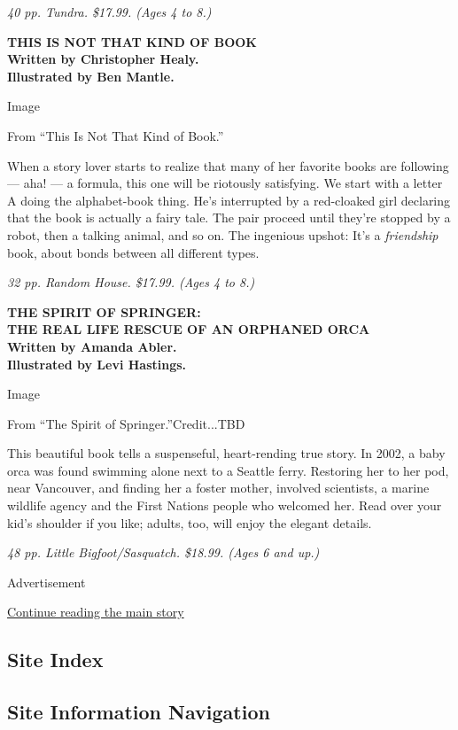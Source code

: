 \emph{40 pp. Tundra. \$17.99. (Ages 4 to 8.)}

\textbf{THIS IS NOT THAT KIND OF BOOK}\\
\textbf{Written by Christopher Healy.}\\
\textbf{Illustrated by Ben Mantle.}

Image

From ``This Is Not That Kind of Book.''

When a story lover starts to realize that many of her favorite books are
following --- aha! --- a formula, this one will be riotously satisfying.
We start with a letter A doing the alphabet-book thing. He's interrupted
by a red-cloaked girl declaring that the book is actually a fairy tale.
The pair proceed until they're stopped by a robot, then a talking
animal, and so on. The ingenious upshot: It's a \emph{friendship} book,
about bonds between all different types.

\emph{32 pp. Random House. \$17.99. (Ages 4 to 8.)}

\textbf{THE SPIRIT OF SPRINGER:}\\
\textbf{THE REAL LIFE RESCUE OF AN ORPHANED ORCA}\\
\textbf{Written by Amanda Abler.}\\
\textbf{Illustrated by Levi Hastings.}

Image

From ``The Spirit of Springer.''Credit...TBD

This beautiful book tells a suspenseful, heart-rending true story. In
2002, a baby orca was found swimming alone next to a Seattle ferry.
Restoring her to her pod, near Vancouver, and finding her a foster
mother, involved scientists, a marine wildlife agency and the First
Nations people who welcomed her. Read over your kid's shoulder if you
like; adults, too, will enjoy the elegant details.

\emph{48 pp. Little Bigfoot/Sasquatch. \$18.99. (Ages 6 and up.)}

Advertisement

\protect\hyperlink{after-bottom}{Continue reading the main story}

\hypertarget{site-index}{%
\subsection{Site Index}\label{site-index}}

\hypertarget{site-information-navigation}{%
\subsection{Site Information
Navigation}\label{site-information-navigation}}

